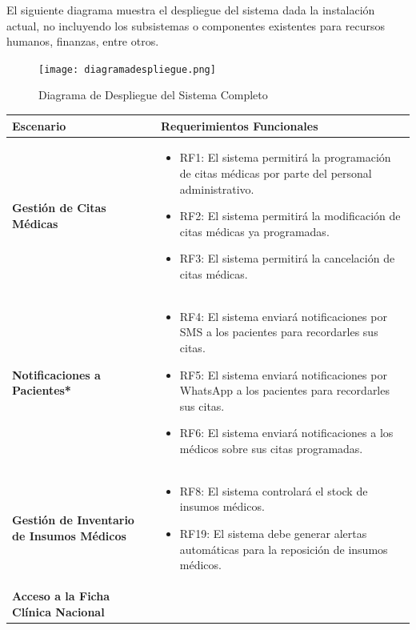 El siguiente diagrama muestra el despliegue del sistema dada la instalación actual, no incluyendo los subsistemas o componentes existentes para recursos humanos, finanzas, entre otros.

\begin{figure}[h]
\centering
\texttt{[image: diagramadespliegue.png]}
\caption{Diagrama de Despliegue del Sistema Completo}
\label{fig:complete_deployment_diagram}
\end{figure}


\begin{table}[h]
    \centering
    \begin{tabular}{|l|p{10cm}|}
    \hline
    \textbf{Escenario} & \textbf{Requerimientos Funcionales} \\ \hline
    \textbf{Gestión de Citas Médicas} & 
    \begin{itemize}
        \item RF1: El sistema permitirá la programación de citas médicas por parte del personal administrativo.
        \item RF2: El sistema permitirá la modificación de citas médicas ya programadas.
        \item RF3: El sistema permitirá la cancelación de citas médicas.
    \end{itemize} \\ \hline
    \textbf{Notificaciones a Pacientes*} & 
    \begin{itemize}
        \item RF4: El sistema enviará notificaciones por SMS a los pacientes para recordarles sus citas.
        \item RF5: El sistema enviará notificaciones por WhatsApp a los pacientes para recordarles sus citas.
        \item RF6: El sistema enviará notificaciones a los médicos sobre sus citas programadas.
    \end{itemize} \\ \hline
    \textbf{Gestión de Inventario de Insumos Médicos} & 
    \begin{itemize}
        \item RF8: El sistema controlará el stock de insumos médicos.
        \item RF19: El sistema debe generar alertas automáticas para la reposición de insumos médicos.
    \end{itemize} \\ \hline
    \textbf{Acceso a la Ficha Clínica Nacional} & 
    \begin{itemize}

\end{itemize}
\end{tabular}
\end{table}
